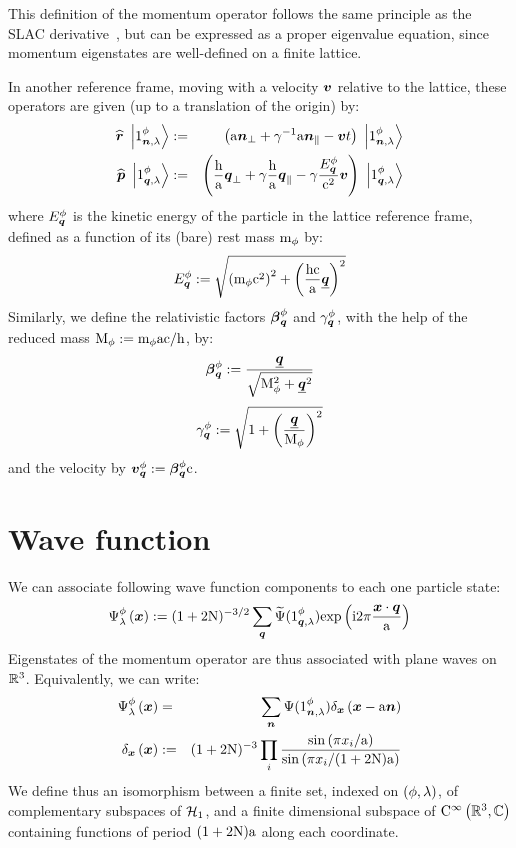  This definition of the momentum operator follows the same principle as the SLAC derivative~\cite{Rabin1981}, but can be expressed as a proper eigenvalue equation, since momentum eigenstates are well-defined on a finite lattice.

 In another reference frame, moving with a velocity $\boldsymbol{v}$ relative to the lattice, these operators are given (up to a translation of the origin) by:
\begin{eqnarray*}
\widehat{\boldsymbol{r}} \ \left|{{1}^{\phi}_{{\boldsymbol{n}}, {\lambda}}}\right\rangle & := & \left( \mathrm a \boldsymbol{n}_\perp + \gamma^{-1} \mathrm a  \boldsymbol{n}_\parallel - \boldsymbol{v} t \right) \ \left|{{1}^{\phi}_{{\boldsymbol{n}}, {\lambda}}}\right\rangle \\
\widehat{\boldsymbol{p}} \ \left|{{1}^{\phi}_{{\boldsymbol{q}}, {\lambda}}}\right\rangle & := & \left( \frac {\mathrm h} {\mathrm a} \boldsymbol{q}_\perp + \gamma \frac {\mathrm h} {\mathrm a} \boldsymbol{q}_\parallel - \gamma \frac {E^{\phi}_{\boldsymbol{q}}} {\mathrm c^2} \boldsymbol{v} \right) \ \left|{{1}^{\phi}_{{\boldsymbol{q}}, {\lambda}}}\right\rangle
\end{eqnarray*}
where $E^{\phi}_{\boldsymbol{q}}$ is the kinetic energy of the particle in the lattice reference frame, defined as a function of its (bare) rest mass $\mathrm m_{\phi}$ by:
\begin{equation*}
E^{\phi}_{\boldsymbol{q}} := \sqrt{\left( \mathrm m_{\phi} \mathrm c^2 \right)^2 + \left( \frac{\mathrm h \mathrm c}{\mathrm a} \underline{\boldsymbol{q}} \right)^2}
\end{equation*}
Similarly, we define the relativistic factors $\boldsymbol{\beta}^{\phi}_{\boldsymbol{q}}$ and $\gamma^{\phi}_{\boldsymbol{q}}$, with the help of the reduced mass $\mathrm M_{\phi} := \mathrm m_{\phi} \mathrm a \mathrm c / \mathrm h$, by:
\begin{equation*}
\boldsymbol{\beta}^{\phi}_{\boldsymbol{q}} := \frac{\underline{\boldsymbol{q}}}{\sqrt{\mathrm M_{\phi}^2 + \underline{\boldsymbol{q}}^2}}
\end{equation*}
\begin{equation*}
\gamma^{\phi}_{\boldsymbol{q}} := \sqrt{1 + \left( \frac{\underline{\boldsymbol{q}}}{\mathrm M_{\phi}} \right)^2}
\end{equation*}
and the velocity by $\boldsymbol{v}^{\phi}_{\boldsymbol{q}} := \boldsymbol{\beta}^{\phi}_{\boldsymbol{q}} \mathrm c$.

\section{Wave function}

 We can associate following wave function components to each one particle state:
\begin{equation*}
{\Psi}^{\phi}_{\lambda}\left({\boldsymbol{x}}\right) := (1+2 \mathrm N)^{-3/2} \sum_{\boldsymbol{q}} \widetilde{\Psi}({1}^{\phi}_{{\boldsymbol{q}}, {\lambda}}) \mathrm{exp} \left( {\mathrm{i} 2 \pi \frac{\boldsymbol{x} \cdot \boldsymbol{q}}{\mathrm a}} \right)
\end{equation*}
Eigenstates of the momentum operator are thus associated with plane waves on $\mathbb{R}^3$. Equivalently, we can write:
\begin{eqnarray*}
{\Psi}^{\phi}_{\lambda}\left({\boldsymbol{x}}\right) & = & \sum_{\boldsymbol{n}} \Psi({1}^{\phi}_{{\boldsymbol{n}}, {\lambda}}) \delta_{\boldsymbol{x}} \left({\boldsymbol{x} - \mathrm a \boldsymbol{n}}\right) \\
\delta_{\boldsymbol{x}} \left({\boldsymbol{x}}\right) & := & (1+2 \mathrm N)^{-3} \prod_i \frac{\mathrm{sin} \left( {\pi {x}_{i} / \mathrm a} \right)}{\mathrm{sin} \left( {\pi {x}_{i} / (1+2 \mathrm N)\mathrm a} \right)}
\end{eqnarray*}
We define thus an isomorphism between a finite set, indexed on $( \phi,\lambda )$, of complementary subspaces of $\mathcal H_{1}$, and a finite dimensional subspace of $\mathrm C^\infty\left(\mathbb{R}^3,\mathbb{C}\right)$ containing functions of period $(1+2\mathrm N)\mathrm a$ along each coordinate.

